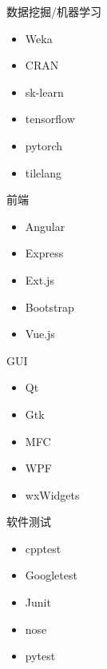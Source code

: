 \documentclass{beamer}
\begin{document}
\begin{frame}[t]{数据挖掘/机器学习}
\begin{block}{}
\begin{itemize}
\item Weka
\item CRAN 
\item sk-learn
\item tensorflow 
\item pytorch
\item tilelang
\end{itemize}
\end{block}
\end{frame}

\begin{frame}[t]{前端}
\begin{block}{}
\begin{itemize}
\item Angular
\item Express
\item Ext.js
\item Bootstrap
\item Vue.js
\end{itemize}
\end{block}
\end{frame}

\begin{frame}[t]{GUI}
\begin{block}{}
\begin{itemize}
\item Qt
\item Gtk
\item MFC
\item WPF
\item wxWidgets 
\end{itemize}
\end{block}
\end{frame}

\begin{frame}[t]{软件测试}
\begin{block}{}
\begin{itemize}
\item cpptest
\item Googletest
\item Junit 
\item nose
\item pytest
\end{itemize}
\end{block}
\end{frame}
\end{document}
